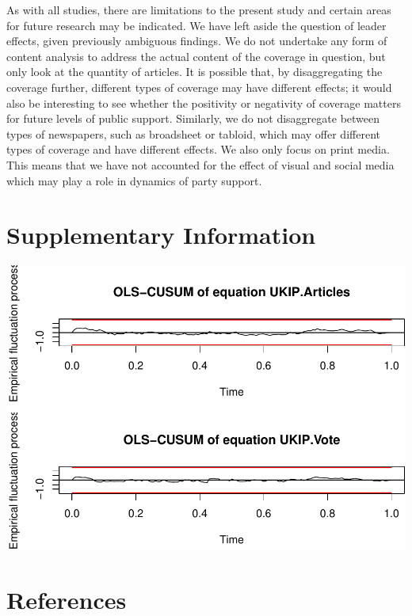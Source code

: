 \documentclass[12pt,article]{article}
\begin{document}
As with all studies, there are limitations to the present study and
certain areas for future research may be indicated. We have left aside
the question of leader effects, given previously ambiguous findings. We
do not undertake any form of content analysis to address the actual
content of the coverage in question, but only look at the quantity of
articles. It is possible that, by disaggregating the coverage further,
different types of coverage may have different effects; it would also be
interesting to see whether the positivity or negativity of coverage
matters for future levels of public support. Similarly, we do not
disaggregate between types of newspapers, such as broadsheet or tabloid,
which may offer different types of coverage and have different effects.
We also only focus on print media. This means that we have not accounted
for the effect of visual and social media which may play a role in
dynamics of party support.

\pagebreak

\section{Supplementary Information}\label{supplementary-information}

\includegraphics{ukip_media_files/figure-latex/supplementary-1.pdf}

\pagebreak

\section{References}\label{references}

\singlespacing
\end{document}
